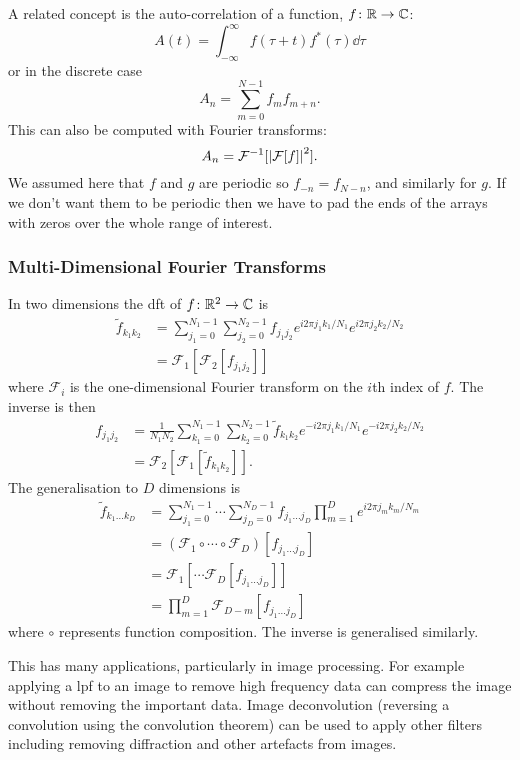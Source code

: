 \documentclass[a4paper]{article}
\newcommand{\FT}{\mathcal{F}}
\begin{document}
    A related concept is the auto-correlation of a function, \(f\colon\mathbb{R}\to\mathbb{C}\):
    \[A(t) = \int_{-\infty}^{\infty} f(\tau + t)f^*(\tau)\dd{\tau}\]
    or in the discrete case
    \[A_n = \sum_{m=0}^{N-1}f_mf_{m+n}.\]
    This can also be computed with Fourier transforms:
    \[A_n = \FT^{-1}[\abs{\FT[f]}^2].\]
    We assumed here that \(f\) and \(g\) are periodic so \(f_{-n} = f_{N-n}\), and similarly for \(g\).
    If we don't want them to be periodic then we have to pad the ends of the arrays with zeros over the whole range of interest.
    
    \subsubsection{Multi-Dimensional Fourier Transforms}
    In two dimensions the \gls{dft} of \(f\colon\mathbb{R}^2\to\mathbb{C}\) is
    \begin{align*}
        \tilde{f}_{k_1k_2} &= \sum_{j_1 = 0}^{N_1 - 1} \sum_{j_2 = 0}^{N_2 - 1} f_{j_1j_2}e^{i2\pi j_1k_1/N_1}e^{i2\pi j_2k_2/N_2}\\
        &= \FT_1[\FT_2[f_{j_1j_2}]]
    \end{align*}
    where \(\FT_i\) is the one-dimensional Fourier transform on the \(i\)th index of \(f\).
    The inverse is then
    \begin{align*}
        f_{j_1j_2} &= \frac{1}{N_1N_2}\sum_{k_1 = 0}^{N_1 - 1} \sum_{k_2 = 0}^{N_2 - 1} \tilde{f}_{k_1k_2}e^{-i2\pi j_1k_1/N_1}e^{-i2\pi j_2k_2/N_2}\\
        &= \FT_2[\FT_1[\tilde{f}_{k_1k_2}]].
    \end{align*}
    The generalisation to \(D\) dimensions is
    \begin{align*}
        \tilde{f}_{k_1\dotso k_D} &= \sum_{j_1 = 0}^{N_1 - 1} \dotsb \sum_{j_D = 0}^{N_D - 1} f_{j_1\dotso j_D}\prod_{m=1}^{D} e^{i2\pi j_mk_m/N_m}\\
        &= (\FT_1\circ \dotsb \circ \FT_D)[f_{j_1\dotso j_D}]\\
        &= \FT_1[\dotsb \FT_D[f_{j_1\dotso j_D}]]\\
        &= \prod_{m=1}^{D}\FT_{D-m}[f_{j_1\dotso j_D}]
    \end{align*}
    where \(\circ\) represents function composition.
    The inverse is generalised similarly.
    
    This has many applications, particularly in image processing.
    For example applying a \gls{lpf} to an image to remove high frequency data can compress the image without removing the important data.
    Image deconvolution (reversing a convolution using the convolution theorem) can be used to apply other filters including removing diffraction and other artefacts from images.
    
\end{document}
